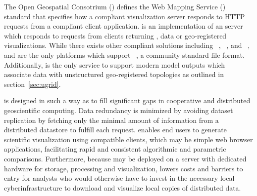 The Open Geospatial Consotrium (\ogc{}) defines the Web Mapping
Service (\wms{})~\cite{wms14} standard that specifies how a compliant
visualization server responds to HTTP requests from a \ogcwms{}
compliant client application. \sciwms{} is an implementation of an
\ogcwms{} server which responds to requests from clients returning
\metadata{}, data or geo-registered visualizations.  While there
exists other \ogcwms{} compliant solutions including
\ncwms{}~\cite{blower13}, \mapserver{}~\cite{mapserver14}, and
\geoserver{}~\cite{geoserver14}, \sciwms{} and \ncwms{} are the only
platforms which support \netcdf{}~\cite{netcdf}, a community standard
file format. Additionally, \sciwms{} is the only \ogcwms{} service to
support modern model outputs which associate data with unstructured
geo-registered topologies as outlined in section~\ref{sec:ugrid}.

\sciwms{} is designed in such a way as to fill significant gaps in
cooperative and distributed geoscientific computing. Data redundancy
is minimized by avoiding dataset replication by fetching only the
minimal amount of information from a distributed datastore to fulfill each
\ogcwms{} request. \sciwms{} enables end users to generate scientific
visualization using \ogcwms{} compatible clients, which may be simple
web browser applications, facilitating rapid and consistent
algorithmic and parametric comparisons. Furthermore, because \sciwms{}
may be deployed on a server with dedicated hardware for storage,
processing and visualization, \sciwms{} lowers costs and barriers to
entry for analysts who would otherwise have to invest in the necessary
local cyberinfrastructure to download and visualize local copies of
distributed data.
